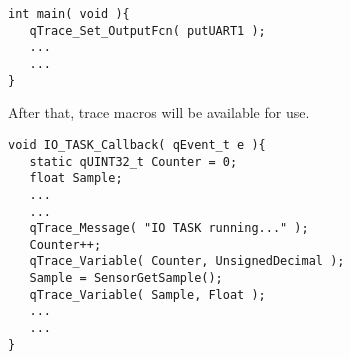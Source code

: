 \begin{lstlisting}[style=CStyle]
int main( void ){
   qTrace_Set_OutputFcn( putUART1 );
   ... 
   ...
}
\end{lstlisting}  

After that, trace macros will be available for use.

\begin{lstlisting}[style=CStyle]
void IO_TASK_Callback( qEvent_t e ){
   static qUINT32_t Counter = 0;
   float Sample;
   ...
   ... 
   qTrace_Message( "IO TASK running..." );
   Counter++;
   qTrace_Variable( Counter, UnsignedDecimal );
   Sample = SensorGetSample();
   qTrace_Variable( Sample, Float );
   ...
   ...
}
\end{lstlisting}

\newpage